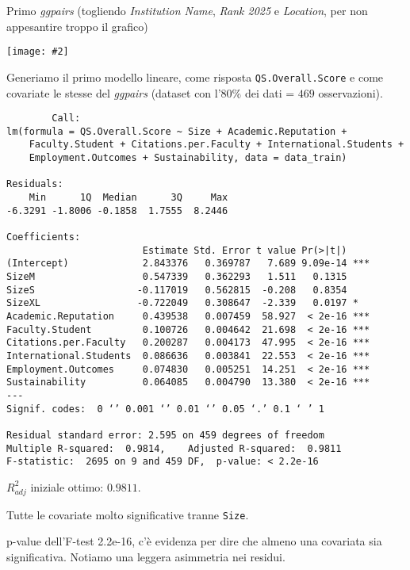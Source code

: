 \documentclass{beamer}
\newcommand{\fg}[2]{%
  \begin{center}
      \texttt{[image: \#2]}%
  \end{center}
}
\begin{document}
\begin{frame}
    Primo \textit{ggpairs} (togliendo \textit{Institution Name}, \textit{Rank 2025} e \textit{Location}, per non appesantire troppo il grafico)
	\fg{1}{ggpairs1.jpg}
\end{frame}

\begin{frame}[fragile]
	Generiamo il primo modello lineare, come risposta \texttt{QS.Overall.Score} e come covariate le stesse del \textit{ggpairs} (dataset con l'$80\%$ dei dati = $469$ osservazioni).
	{\tiny
	\begin{verbatim}
		Call:
lm(formula = QS.Overall.Score ~ Size + Academic.Reputation + 
    Faculty.Student + Citations.per.Faculty + International.Students + 
    Employment.Outcomes + Sustainability, data = data_train)

Residuals:
    Min      1Q  Median      3Q     Max 
-6.3291 -1.8006 -0.1858  1.7555  8.2446 

Coefficients:
                        Estimate Std. Error t value Pr(>|t|)    
(Intercept)             2.843376   0.369787   7.689 9.09e-14 ***
SizeM                   0.547339   0.362293   1.511   0.1315    
SizeS                  -0.117019   0.562815  -0.208   0.8354    
SizeXL                 -0.722049   0.308647  -2.339   0.0197 *  
Academic.Reputation     0.439538   0.007459  58.927  < 2e-16 ***
Faculty.Student         0.100726   0.004642  21.698  < 2e-16 ***
Citations.per.Faculty   0.200287   0.004173  47.995  < 2e-16 ***
International.Students  0.086636   0.003841  22.553  < 2e-16 ***
Employment.Outcomes     0.074830   0.005251  14.251  < 2e-16 ***
Sustainability          0.064085   0.004790  13.380  < 2e-16 ***
---
Signif. codes:  0 ‘’ 0.001 ‘’ 0.01 ‘’ 0.05 ‘.’ 0.1 ‘ ’ 1

Residual standard error: 2.595 on 459 degrees of freedom
Multiple R-squared:  0.9814,	Adjusted R-squared:  0.9811 
F-statistic:  2695 on 9 and 459 DF,  p-value: < 2.2e-16

	\end{verbatim}
	}
\end{frame}

\begin{frame}
	$R^2_{adj}$ iniziale ottimo: $0.9811$.

	Tutte le covariate molto significative tranne \texttt{Size}.

	p-value dell'F-test 2.2e-16, c'è evidenza per dire che almeno una covariata sia significativa.
    Notiamo una leggera asimmetria nei residui.
 
\end{frame}
\end{document}

